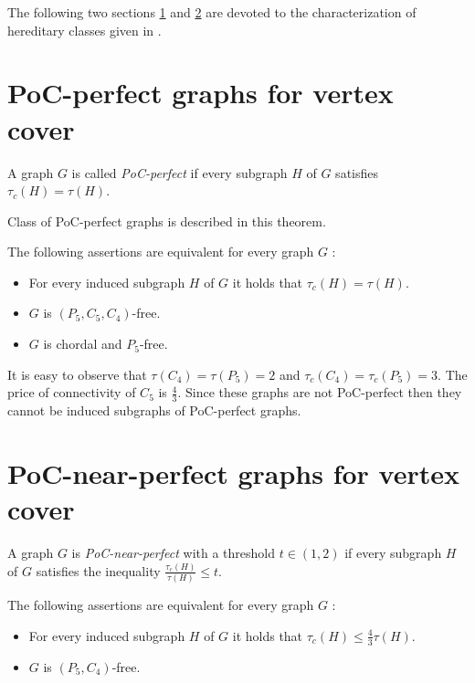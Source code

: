 The following two sections \ref{3:1} and \ref{3:2} are devoted to the characterization of hereditary classes given in \cite{CambyCardinalFioriniSchaudt14}.   
\section{PoC-perfect graphs for vertex cover}\label{3:1}
\begin{defn}
A graph \(G\) is called \emph{PoC-perfect} if every subgraph \(H\) of \(G\) satisfies \(\tau_c(H)=\tau(H)\).
\end{defn}

Class of PoC-perfect graphs is described in this theorem.
\begin{thm}\label{pocVC:1}
The following assertions are equivalent for every graph \(G\) :
\begin{itemize}
\item For every induced subgraph \(H\) of \(G\) it holds that \(\tau_c(H) = \tau (H)\).
\item \(G\) is \((P_5, C_5, C_4)\)-free.
\item \(G\) is chordal and \(P_5\)-free.
\end{itemize}
\end{thm}

It is easy to observe that \(\tau(C_4) = \tau(P_5) = 2\) and \(\tau_c(C_4) = \tau_c(P_5) = 3\).
The price of connectivity of \(C_5\) is \(\frac{4}{3}\). 
Since these graphs are not PoC-perfect then they cannot be induced subgraphs of PoC-perfect graphs.

\section{PoC-near-perfect graphs for vertex cover}\label{3:2}

\begin{defn}
A graph \(G\) is \emph{PoC-near-perfect} with a threshold \(t \in (1, 2)\) if every subgraph \(H\) of \(G\) satisfies the inequality \(\frac{\tau_c(H)}{\tau(H)} \leq t\).
\end{defn}

\begin{thm}\label{pocVC:2}
The following assertions are equivalent for every graph \(G\) :
\begin{itemize} 
\item For every induced subgraph \(H\) of \(G\) it holds that \(\tau_c(H) \leq {\frac{4}{3} \tau(H)}\).
\item \(G\) is \((P_5 , C_4)\)-free.
\end{itemize}
\end{thm}


